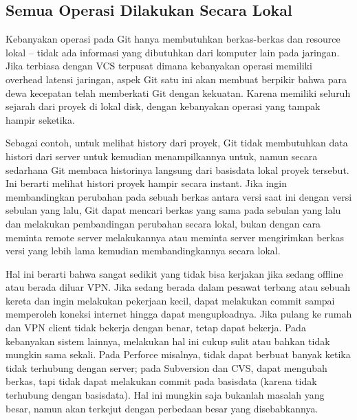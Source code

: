 \subsection{Semua Operasi Dilakukan Secara Lokal}
\par
\hspace*{0.5in} Kebanyakan operasi pada Git hanya membutuhkan berkas-berkas dan resource lokal – tidak ada informasi yang dibutuhkan dari komputer lain pada jaringan. Jika terbiasa dengan VCS terpusat dimana kebanyakan operasi memiliki overhead latensi jaringan, aspek Git satu ini akan membuat berpikir bahwa para dewa kecepatan telah memberkati Git dengan kekuatan. Karena memiliki seluruh sejarah dari proyek di lokal disk, dengan kebanyakan operasi yang tampak hampir seketika. \par
\hspace*{0.5in} Sebagai contoh, untuk melihat history dari proyek, Git tidak membutuhkan data histori dari server untuk kemudian menampilkannya untuk, namun secara sedarhana Git membaca historinya langsung dari basisdata lokal proyek tersebut. Ini berarti melihat histori proyek hampir secara instant. Jika ingin membandingkan perubahan pada sebuah berkas antara versi saat ini dengan versi sebulan yang lalu, Git dapat mencari berkas yang sama pada sebulan yang lalu dan melakukan pembandingan perubahan secara lokal, bukan dengan cara meminta remote server melakukannya atau meminta server mengirimkan berkas versi yang lebih lama kemudian membandingkannya secara lokal. \par
\hspace*{0.5in} Hal ini berarti bahwa sangat sedikit yang tidak bisa kerjakan jika sedang offline atau berada diluar VPN. Jika sedang berada dalam pesawat terbang atau sebuah kereta dan ingin melakukan pekerjaan kecil, dapat melakukan commit sampai memperoleh koneksi internet hingga dapat menguploadnya. Jika pulang ke rumah dan VPN client tidak bekerja dengan benar, tetap dapat bekerja. Pada kebanyakan sistem lainnya, melakukan hal ini cukup sulit atau bahkan tidak mungkin sama sekali. Pada Perforce misalnya, tidak dapat berbuat banyak ketika tidak terhubung dengan server; pada Subversion dan CVS,  dapat mengubah berkas, tapi tidak dapat melakukan commit pada basisdata (karena tidak terhubung dengan basisdata). Hal ini mungkin saja bukanlah masalah yang besar, namun akan terkejut dengan perbedaan besar yang disebabkannya. \par

